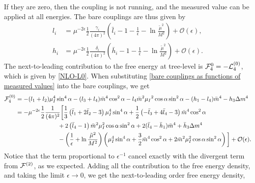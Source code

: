 If they are zero, then the coupling is not running, and the measured value can be applied at all energies.
The bare couplings are thus given by
\begin{align}
    \label{bare couplings as functions of measured values}
    l_i &= \mu^{-2\epsilon} \frac{1}{2} \frac{\gamma_i}{(4 \pi)^2}
    \left(
        \bar l_i -1- \frac{1}{\epsilon} - \ln\frac{\tilde \mu^2}{M^2}
    \right)+ \mathcal{O}(\epsilon), \\
    h_i &= \mu^{-2\epsilon} \frac{1}{2} \frac{\delta_i}{(4 \pi)^2}
    \left(
        \bar h_i - 1 - \frac{1}{\epsilon} - \ln\frac{\tilde \mu^2}{M^2}
    \right)
    + \mathcal{O}(\epsilon).
\end{align}
%
The next-to-leading contribution to the free energy at tree-level is $\mathcal{F}_4^{0} = - \mathcal{L}_4^{(0)}$, which is given by \autoref{NLO-L0}.
When substituting \autoref{bare couplings as functions of measured values} into the bare couplings, we get
%
\begin{align*}
    \mathcal{F}^{(0)}_4
    & = 
    - (l_1 + l_2)\mu_I^4 \sin^4{\alpha}
    - (l_3 + l_4)\bar m^4 \cos^2{\alpha}
    - l_4 \bar m^2 \mu_I{}^2 \cos{\alpha} \sin^2{\alpha}
    -(h_1- l_4) \bar m^4
    - h_3 \Delta m^4
    \\
    & = 
    - \mu^{-2 \epsilon} \frac{1}{2} \frac{1}{(4 \pi)^2}
    \bigg[
        \frac{1}{3}
        \left( 
            \bar l_1 + 2 \bar l_2 - 3
        \right) \mu_I^4 \sin^4 \alpha
        +
        \frac{1}{2}
        \left(
            - \bar l_3 + 4 \bar l_4 - 3
        \right) \bar m^4 \cos^2\alpha
        \\
        & \quad \quad \quad \quad \quad \quad \quad
        + 2 \left(\bar l_4 - 1\right)
        \bar m^2 \mu_I^2 \cos\alpha \sin^2 \alpha
        + 2 (\bar l_4 - \bar h_1) \bar m^4
        + \bar h_3 \Delta m^4
        \\
        & \quad \quad \quad \quad \quad \quad \quad
        - 
        \left(\frac{1}{\epsilon} + \ln \frac{\tilde \mu^2}{M^2}\right) 
        \left(
            \mu_I^4\sin^4\alpha + \frac{3}{2} \bar m^4 \cos^2 \alpha
            + 2 \bar m^2 \mu_I^2 \cos\alpha \sin^2 \alpha
        \right) 
    \bigg] + \mathcal{O}(\epsilon).
\end{align*}
%
Notice that the term proportional to $\epsilon^{-1}$ cancel exactly with the divergent term from $\mathcal{F}^{(2)}$, as we expected.
Adding all the contribution to the free energy density, and taking the limit $\epsilon \rightarrow 0$, we get the next-to-leading order free energy density,
%
